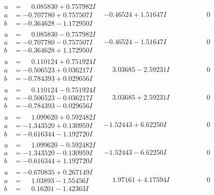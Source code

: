 \documentclass[1p]{elsarticle_modified}
\theoremstyle{definition}
\begin{document}
$$\begin{array}{c|c|c}
\begin{aligned}
u &= \phantom{-}0.085830 + 0.757982 I \\
a &= -0.707780 + 0.757507 I \\
b &= -0.364628 - 1.172950 I\end{aligned}
 & -0.46524 + 1.51647 I & \phantom{-0.000000 } 0 \\ \hline\begin{aligned}
u &= \phantom{-}0.085830 - 0.757982 I \\
a &= -0.707780 - 0.757507 I \\
b &= -0.364628 + 1.172950 I\end{aligned}
 & -0.46524 - 1.51647 I & \phantom{-0.000000 } 0 \\ \hline\begin{aligned}
u &= \phantom{-}0.110124 + 0.751924 I \\
a &= -0.506523 + 0.036217 I \\
b &= -0.784393 + 0.029656 I\end{aligned}
 & \phantom{-}3.03685 - 2.59231 I & \phantom{-0.000000 } 0 \\ \hline\begin{aligned}
u &= \phantom{-}0.110124 - 0.751924 I \\
a &= -0.506523 - 0.036217 I \\
b &= -0.784393 - 0.029656 I\end{aligned}
 & \phantom{-}3.03685 + 2.59231 I & \phantom{-0.000000 } 0 \\ \hline\begin{aligned}
u &= \phantom{-}1.099620 + 0.592482 I \\
a &= -1.343520 + 0.130959 I \\
b &= -0.616344 - 1.192720 I\end{aligned}
 & -1.52443 + 6.62250 I & \phantom{-0.000000 } 0 \\ \hline\begin{aligned}
u &= \phantom{-}1.099620 - 0.592482 I \\
a &= -1.343520 - 0.130959 I \\
b &= -0.616344 + 1.192720 I\end{aligned}
 & -1.52443 - 6.62250 I & \phantom{-0.000000 } 0 \\ \hline\begin{aligned}
u &= -0.670835 + 0.267149 I \\
a &= \phantom{-}1.03893 - 1.55456 I \\
b &= \phantom{-}0.16201 - 1.42363 I\end{aligned}
 & \phantom{-}1.97161 + 4.17594 I & \phantom{-0.000000 } 0 \\ \hline\begin{aligned}

\end{aligned}
\end{array}$$
\end{document}
